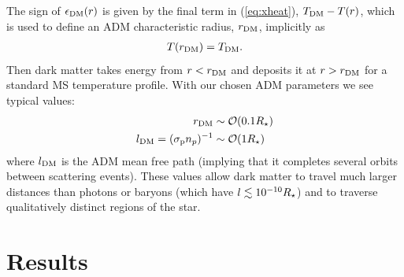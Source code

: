 \documentclass[useAMS,usenatbib]{mnras}
\begin{document}
  The sign of $\epsilon_{\mathrm{DM}}(r)$ is given by the final term in (\ref{eq:xheat}), $T_{\mathrm{DM}} - T(r)$, which is used to define an ADM characteristic radius, $r_{\mathrm{DM}}$, implicitly as
  \begin{align}
    T(r_{\mathrm{DM}}) = T_{\mathrm{DM}}.
  \end{align}
  Then dark matter takes energy from $r < r_{\mathrm{DM}}$ and deposits it at $r > r_{\mathrm{DM}}$ for a standard MS temperature profile. With our chosen ADM parameters we see typical values:
  \begin{align}
    r_{\mathrm{DM}} & \sim \mathcal{O}(0.1 R_{\star}) \\
    l_{\mathrm{DM}} = (\sigma_{\mathrm{p}} n_p)^{-1} & \sim\mathcal{O}(1 R_{\star})
  \end{align}
  where $l_{\mathrm{DM}}$ is the ADM mean free path (implying that it completes several orbits between scattering events). These values allow dark matter to travel much larger distances than photons or baryons  (which have $l \lesssim 10^{-10} R_{\star}$) and to traverse qualitatively distinct regions of the star. 




\section{Results}
\label{sec:results}
\end{document}
